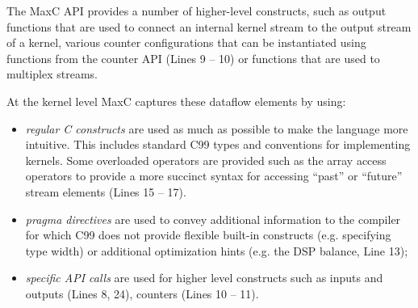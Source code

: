 The MaxC API provides a number of higher-level constructs, such as
output functions that are used to connect an internal kernel stream to
the output stream of a kernel, various counter configurations that can
be instantiated using functions from the counter API (Lines 9 -- 10)
or functions that are used to multiplex streams.

At the kernel level MaxC captures these dataflow elements by using:

\begin{itemize}
\item \emph{regular C constructs} are used as much as possible to make
  the language more intuitive. This includes standard C99 types and
  conventions for implementing kernels. Some overloaded operators are
  provided such as the array access operators to provide a more
  succinct syntax for accessing ``past'' or ``future'' stream elements
  (Lines 15 -- 17).

\item \emph{pragma directives} are used to convey additional
  information to the compiler for which C99 does not provide flexible
  built-in constructs (e.g. specifying type width) or additional
  optimization hints (e.g. the DSP balance, Line 13);

\item \emph{specific API calls} are used for higher level constructs
  such as inputs and outputs (Lines 8, 24), counters (Lines 10 -- 11).

\end{itemize}


